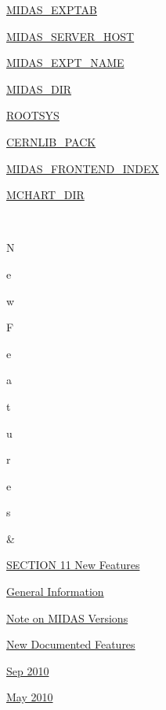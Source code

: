 \begin{TabularC}{2}
\begin{TabularC}{2}
\begin{DoxyItemize}
\begin{DoxyItemize}
\item \hyperlink{BuildingOptions_BO_MIDAS_EXPTAB}{MIDAS\_\-EXPTAB} 
\item \hyperlink{BuildingOptions_BO_MIDAS_SERVER_HOST}{MIDAS\_\-SERVER\_\-HOST} 
\item \hyperlink{BuildingOptions_BO_MIDAS_EXPT_NAME}{MIDAS\_\-EXPT\_\-NAME} 
\item \hyperlink{BuildingOptions_BO_MIDAS_DIR}{MIDAS\_\-DIR} 
\item \hyperlink{BuildingOptions_BO_ROOTSYS}{ROOTSYS} 
\item \hyperlink{BuildingOptions_BO_CERNLIB_PACK}{CERNLIB\_\-PACK} 
\item \hyperlink{BuildingOptions_BO_MIDAS_FRONTEND_INDEX}{MIDAS\_\-FRONTEND\_\-INDEX} 
\item \hyperlink{BuildingOptions_BO_MCHART_DIR}{MCHART\_\-DIR} 
\end{DoxyItemize}
\end{DoxyItemize}\\
 \par
\par
\par
N\par
e\par
w\par
 \par
F\par
e\par
a\par
t\par
u\par
r\par
e\par
s\par
   &\label{O_Contents_Page_NDF_section_index}
\hypertarget{O_Contents_Page_NDF_section_index}{}
 \par
 \hyperlink{NDF}{SECTION 11 New Features} 
\begin{DoxyItemize}
\item \hyperlink{NDF_ndf_info}{General Information} 
\begin{DoxyItemize}
\item \hyperlink{NDF_NDF_versions}{Note on MIDAS Versions} 
\end{DoxyItemize}
\item \hyperlink{NDF_ndf_New_Features}{New Documented Features} 
\begin{DoxyItemize}
\item \hyperlink{NDF_ndf_sep_2010}{Sep 2010} 
\item \hyperlink{NDF_ndf_may_2010}{May 2010} 

\end{DoxyItemize}
\end{DoxyItemize}
\end{TabularC}
\end{TabularC}

